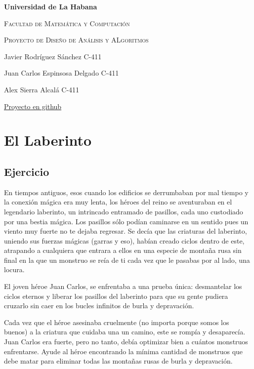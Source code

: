 \documentclass{article}
\begin{document}
\begin{titlepage}
    \centering
    {\bfseries\LARGE Universidad de La Habana \par}
    \vspace{1cm}
    {\scshape\Large Facultad de Matemática y Computación \par}
    \vspace{3cm}
    {\scshape\Huge Proyecto de Diseño de Análisis y ALgoritmos\par}
    \vfill

    {\Large Javier Rodríguez Sánchez C-411 \par}
    {\Large Juan Carlos Espinsosa Delgado C-411 \par}
    {\Large Alex Sierra Alcalá C-411 \par}

    \vfill
    {\href{https://github.com/alexsierra45/daa}{Proyecto en github} \par}
\end{titlepage}

\tableofcontents

\newpage

\section{El Laberinto}

\subsection{Ejercicio}

En tiempos antiguos, esos cuando los edificios se derrumbaban por mal tiempo y la conexión mágica era muy lenta, los héroes del reino se aventuraban en el legendario laberinto, un intrincado entramado de pasillos, cada uno custodiado por una bestia mágica. Los pasillos sólo podían caminarse en un sentido pues un viento muy fuerte no te dejaba regresar. Se decía que las criaturas del laberinto, uniendo sus fuerzas mágicas (garras y eso), habían creado ciclos dentro de este, atrapando a cualquiera que entrara a ellos en una especie de montaña rusa sin final en la que un monstruo se reía de ti cada vez que le pasabas por al lado, una locura.

El joven héroe Juan Carlos, se enfrentaba a una prueba única: desmantelar los ciclos eternos y liberar los pasillos del laberinto para que su gente pudiera cruzarlo sin caer en los bucles infinitos de burla y depravación.

Cada vez que el héroe asesinaba cruelmente (no importa porque somos los buenos) a la criatura que cuidaba una un camino, este se rompía y desaparecía. Juan Carlos era fuerte, pero no tanto, debía optimizar bien a cuántos monstruos enfrentarse. Ayude al héroe encontrando la mínima cantidad de monstruos que debe matar para eliminar todas las montañas rusas de burla y depravación.
\end{document}
